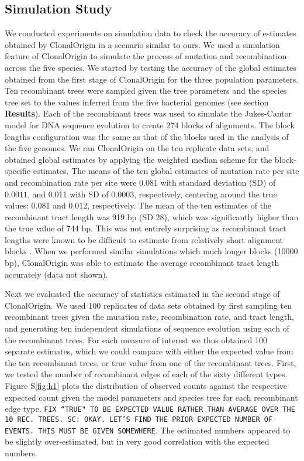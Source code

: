 \documentclass[english]{article}
\begin{document}
\subsection{Simulation Study}
We conducted experiments on simulation data to check the accuracy of 
estimates obtained by ClonalOrigin in a scenario similar to ours. We used a 
simulation feature of ClonalOrigin to simulate the process of mutation and 
recombination across the five species.
We started by testing the accuracy of the global estimates obtained from the 
first stage of ClonalOrigin for the three population parameters.
Ten recombinant trees were sampled given the tree parameters and the species
tree  set to the values inferred from the 
five bacterial genomes (see section \textbf{Results}).
Each of the recombinant trees was used to simulate
the Jukes-Cantor model for DNA sequence evolution to create 274 blocks of
alignments. 
The block lengths configuration was the same as that of the blocks 
used in the analysis of the five genomes.
We ran ClonalOrigin 
on the ten replicate data sets, and obtained global estimates by applying the 
weighted median scheme for the block-specific estimates. The means of the ten 
global estimates of mutation rate per site and recombination rate per site were 
0.081 with standard deviation (SD) of $0.0011$, and 0.011 with SD of $0.0003$, 
respectively, centering
around the true values: 0.081 and 0.012, respectively. The mean 
of the ten estimates of the recombinant tract length was 919 bp (SD 28), which 
was significantly higher than the true value of 744 bp. This was not entirely 
surprising as recombinant tract lengths were known to be difficult to 
estimate from relatively short alignment blocks \citep{Didelot2010}. When we 
performed similar simulations which much longer blocks (10000 bp), 
ClonalOrigin was able to estimate the average recombinant tract length 
accurately (data not shown).

Next we evaluated the accuracy of statistics estimated in 
the second stage of ClonalOrigin. We used 100 replicates of data sets obtained
by first
sampling ten recombinant trees given the mutation rate, recombination rate, and
tract length, and generating ten independent 
simulations of sequence evolution using each of the recombinant trees. For each measure 
of interest we thus obtained 100 separate estimates, which we could compare 
with either
the expected value from the ten recombinant trees, or 
true value from one of the recombinant trees. 
First, we tested the number of 
recombinant edges of each of the sixty different types. Figure S\ref{fig:h1} 
plots  the distribution of observed counts against the 
respective expected count given the model parameters and species tree 
for each recombinant edge type.
\texttt{FIX ``TRUE" TO BE EXPECTED VALUE RATHER THAN AVERAGE OVER THE 10 REC. 
TREES. SC: OKAY. LET'S FIND THE PRIOR EXPECTED NUMBER OF EVENTS. THIS MUST BE
GIVEN SOMEWHERE}. 
The estimated numbers appeared to be slightly over-estimated, but in 
very good correlation with the expected numbers. 
\end{document}
